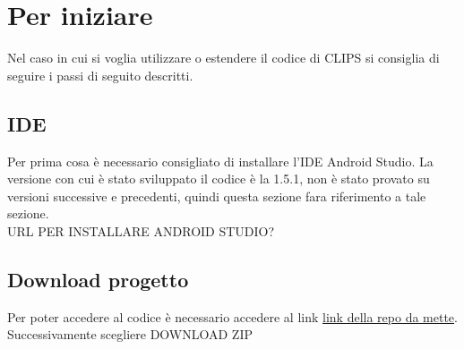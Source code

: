 \documentclass[../ManualeSviluppatore.tex]{subfiles}
\begin{document}
\section{Per iniziare}
Nel caso in cui si voglia utilizzare o estendere il codice di CLIPS si consiglia di seguire i passi di seguito descritti.
	\subsection{IDE}
		Per prima cosa è necessario consigliato di installare l'IDE Android Studio. La versione con cui è stato sviluppato il codice è la 1.5.1, non è stato provato su versioni successive e precedenti, quindi questa sezione fara riferimento a tale sezione. \\
		URL PER INSTALLARE ANDROID STUDIO?
	\subsection{Download progetto}
		Per poter accedere al codice è necessario accedere al link \href{http://leafswe.github.io/clips/com/leaf/clips/model/package-summary.html}{link della repo da mette}. Successivamente scegliere DOWNLOAD ZIP
\end{document}
